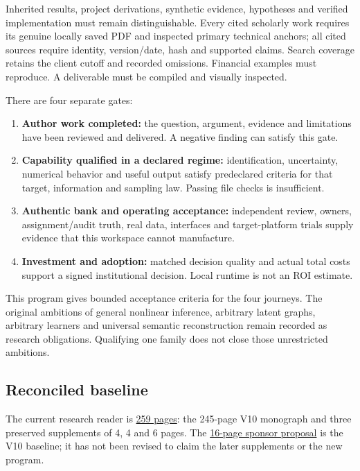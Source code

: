 \documentclass[
  11pt,
  a4paper,
]{article}
\providecommand{\tightlist}{%
  \setlength{\itemsep}{0pt}\setlength{\parskip}{0pt}}
\begin{document}
Inherited results, project derivations, synthetic evidence, hypotheses
and verified implementation must remain distinguishable. Every cited
scholarly work requires its genuine locally saved PDF and inspected
primary technical anchors; all cited sources require identity,
version/date, hash and supported claims. Search coverage retains the
client cutoff and recorded omissions. Financial examples must reproduce.
A deliverable must be compiled and visually inspected.

There are four separate gates:

\begin{enumerate}
\def\labelenumi{\arabic{enumi}.}
\tightlist
\item
  \textbf{Author work completed:} the question, argument, evidence and
  limitations have been reviewed and delivered. A negative finding can
  satisfy this gate.
\item
  \textbf{Capability qualified in a declared regime:} identification,
  uncertainty, numerical behavior and useful output satisfy predeclared
  criteria for that target, information and sampling law. Passing file
  checks is insufficient.
\item
  \textbf{Authentic bank and operating acceptance:} independent review,
  owners, assignment/audit truth, real data, interfaces and
  target-platform trials supply evidence that this workspace cannot
  manufacture.
\item
  \textbf{Investment and adoption:} matched decision quality and actual
  total costs support a signed institutional decision. Local runtime is
  not an ROI estimate.
\end{enumerate}

This program gives bounded acceptance criteria for the four journeys.
The original ambitions of general nonlinear inference, arbitrary latent
graphs, arbitrary learners and universal semantic reconstruction remain
recorded as research obligations. Qualifying one family does not close
those unrestricted ambitions.

\hypertarget{reconciled-baseline}{%
\subsection{Reconciled baseline}\label{reconciled-baseline}}

The current research reader is
\href{../causal_foundations_with_linked_audits_2026-10-11.pdf}{259
pages}: the 245-page V10 monograph and three preserved supplements of 4,
4 and 6 pages. The \href{../sponsor_reconstruction.pdf}{16-page sponsor
proposal} is the V10 baseline; it has not been revised to claim the
later supplements or the new program.
\end{document}
